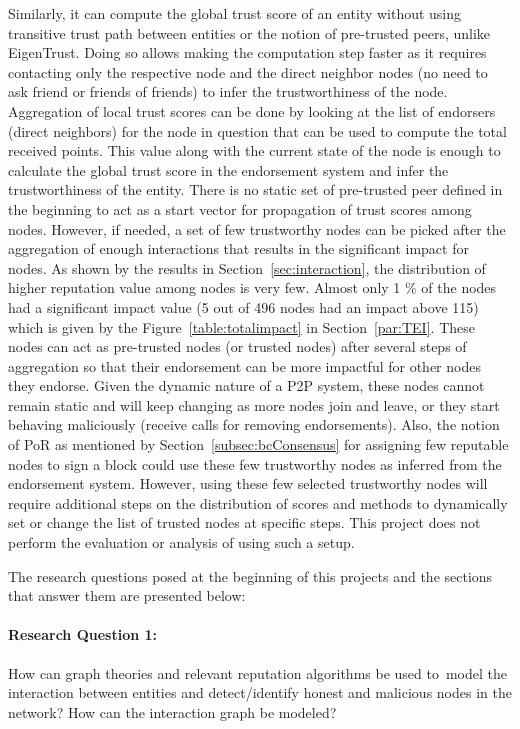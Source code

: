 Similarly, it can compute the global trust score of an entity without using
transitive trust path between entities or the notion of pre-trusted peers,
unlike EigenTrust. Doing so allows making the computation step faster as it
requires contacting only the respective node and the direct neighbor nodes (no
need to ask friend or friends of friends) to infer the trustworthiness of the
node. Aggregation of local trust scores can be done by looking at the list of
endorsers (direct neighbors) for the node in question that can be used to
compute the total received points. This value along with the current state of
the node is enough to calculate the global trust score in the endorsement
system and infer the trustworthiness of the entity. There is no static set of
pre-trusted peer defined in the beginning to act as a start vector for
propagation of trust scores among nodes. However, if needed, a set of few
trustworthy nodes can be picked after the aggregation of enough interactions
that results in the significant impact for nodes. As shown by the results in
Section~\ref{sec:interaction}, the distribution of higher reputation value
among nodes is very few. Almost only 1 \% of the nodes had a significant impact
value (5 out of 496 nodes had an impact above 115) which is given by the
Figure~\ref{table:totalimpact} in Section~\ref{par:TEI}. These nodes can act as
pre-trusted nodes (or trusted nodes) after several steps of aggregation so that
their endorsement can be more impactful for other nodes they endorse. Given the
dynamic nature of a P2P system, these nodes cannot remain static and will keep
changing as more nodes join and leave, or they start behaving maliciously
(receive calls for removing endorsements). Also, the notion of \ac{PoR} as
mentioned by Section~\ref{subsec:bcConsensus} for assigning few reputable nodes
to sign a block could use these few trustworthy nodes as inferred from the
endorsement system. However, using these few selected trustworthy nodes will
require additional steps on the distribution of scores and methods to
dynamically set or change the list of trusted nodes at specific steps. This
project does not perform the evaluation or analysis of using such a setup. \par

The research questions posed at the beginning of this projects and the sections
that answer them are presented below:  
\paragraph{Research Question 1:}How can graph theories and relevant reputation
algorithms be used to model the interaction between entities and
detect/identify honest and malicious nodes in the network? How can the
interaction graph be modeled? \par

